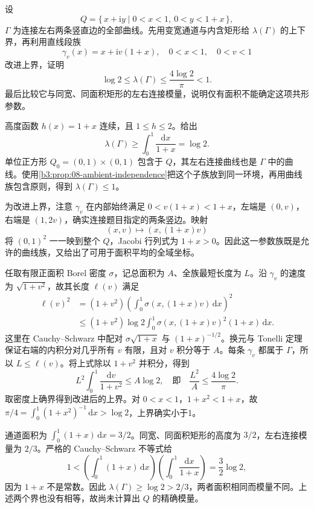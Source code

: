 \begin{exercise}\label{b3:ex:08-5}
设
\[
 Q=\{\,x+\mathrm{i}y\mid0<x<1,\ 0<y<1+x\,\},
\]
\(\Gamma\) 为连接左右两条竖直边的全部曲线。先用变宽通道与内含矩形给 \(\lambda(\Gamma)\) 的上下界，再利用直线段族
\[
 \gamma_v(x)=x+\mathrm{i}v(1+x),\quad
 0<x<1,\quad0<v<1
\]
改进上界，证明
\[
 \log2\le\lambda(\Gamma)\le\frac{4\log2}{\pi}<1.
\]
最后比较它与同宽、同面积矩形的左右连接模量，说明仅有面积不能确定这项共形参数。
\end{exercise}
\begin{solution}
高度函数 \(h(x)=1+x\) 连续，且 \(1\le h\le2\)。给出
\[
 \lambda(\Gamma)\ge\int_0^1\frac{\mathrm{d}x}{1+x}=\log2.
\]
单位正方形 \(Q_0=(0,1)\times(0,1)\) 包含于 \(Q\)，其左右连接曲线也是 \(\Gamma\) 中的曲线。使用\cref{b3:prop:08-ambient-independence}把这个子族放到同一环境，再用曲线族包含原则，得到 \(\lambda(\Gamma)\le1\)。

为改进上界，注意 \(\gamma_v\) 在内部始终满足 \(0<v(1+x)<1+x\)，左端是 \((0,v)\)，右端是 \((1,2v)\)，确实连接题目指定的两条竖边。映射
\[
 (x,v)\longmapsto(x,(1+x)v)
\]
将 \((0,1)^2\) 一一映到整个 \(Q\)，Jacobi 行列式为 \(1+x>0\)。因此这一参数族既是允许的曲线族，又给出了可用于面积平均的全域坐标。

任取有限正面积 Borel 密度 \(\sigma\)，记总面积为 \(A\)、全族最短长度为 \(L\)。沿 \(\gamma_v\) 的速度为 \(\sqrt{1+v^2}\)，故其长度 \(\ell(v)\) 满足
\[
 \begin{aligned}
 \ell(v)^2
 &=(1+v^2)\left(\int_0^1
       \sigma(x,(1+x)v)\,\mathrm{d}x\right)^2\\
 &\le(1+v^2)\log2\int_0^1
       \sigma(x,(1+x)v)^2(1+x)\,\mathrm{d}x.
 \end{aligned}
\]
这里在 Cauchy--Schwarz 中配对 \(\sigma\sqrt{1+x}\) 与 \((1+x)^{-1/2}\)。换元与 Tonelli 定理保证右端的内积分对几乎所有 \(v\) 有限，且对 \(v\) 积分等于 \(A\)。每条 \(\gamma_v\) 都属于 \(\Gamma\)，所以 \(L\le\ell(v)\)。将上式除以 \(1+v^2\) 并积分，得到
\[
 L^2\int_0^1\frac{\mathrm{d}v}{1+v^2}
 \le A\log2,
 \quad\text{即}\quad
 \frac{L^2}{A}\le\frac{4\log2}{\pi}.
\]
取密度上确界得到改进后的上界。对 \(0<x<1\)，\(1+x^2<1+x\)，故
\(\pi/4=\int_0^1(1+x^2)^{-1}\,\mathrm{d}x>\log2\)，上界确实小于1。

通道面积为 \(\int_0^1(1+x)\,\mathrm{d}x=3/2\)。同宽、同面积矩形的高度为 \(3/2\)，左右连接模量为 \(2/3\)。严格的 Cauchy--Schwarz 不等式给
\[
 1<\left(\int_0^1(1+x)\,\mathrm{d}x\right)
       \left(\int_0^1\frac{\mathrm{d}x}{1+x}\right)
 =\frac32\log2,
\]
因为 \(1+x\) 不是常数。因此 \(\lambda(\Gamma)\ge\log2>2/3\)，两者面积相同而模量不同。上述两个界也没有相等，故尚未计算出 \(Q\) 的精确模量。
\end{solution}

